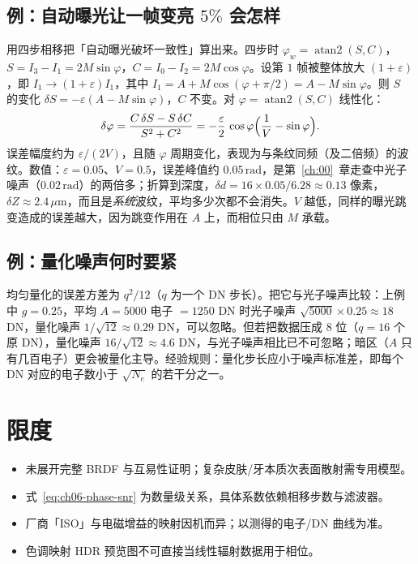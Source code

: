 \subsection{例：自动曝光让一帧变亮 $5\%$ 会怎样}

用四步相移把「自动曝光破坏一致性」算出来。四步时 $\varphi_w=\operatorname{atan2}(S,C)$，$S=I_3-I_1=2M\sin\varphi$，$C=I_0-I_2=2M\cos\varphi$。设第 $1$ 帧被整体放大 $(1+\varepsilon)$，即 $I_1\to(1+\varepsilon)I_1$，其中 $I_1=A+M\cos(\varphi+\pi/2)=A-M\sin\varphi$。则 $S$ 的变化 $\delta S=-\varepsilon(A-M\sin\varphi)$，$C$ 不变。对 $\varphi=\operatorname{atan2}(S,C)$ 线性化：
\[
  \delta\varphi=\frac{C\,\delta S-S\,\delta C}{S^2+C^2}
  =-\frac{\varepsilon}{2}\,\cos\varphi\Bigl(\frac{1}{V}-\sin\varphi\Bigr).
\]
误差幅度约为 $\varepsilon/(2V)$，且随 $\varphi$ 周期变化，表现为与条纹同频（及二倍频）的波纹。数值：$\varepsilon=0.05$、$V=0.5$，误差峰值约 $0.05\,\mathrm{rad}$，是第~\ref{ch:00}~章走查中光子噪声（$0.02\,\mathrm{rad}$）的两倍多；折算到深度，$\delta d=16\times0.05/6.28\approx0.13$ 像素，$\delta Z\approx2.4\,\mu\mathrm{m}$，而且是\emph{系统}波纹，平均多少次都不会消失。$V$ 越低，同样的曝光跳变造成的误差越大，因为跳变作用在 $A$ 上，而相位只由 $M$ 承载。

\subsection{例：量化噪声何时要紧}

均匀量化的误差方差为 $q^2/12$（$q$ 为一个 DN 步长）。把它与光子噪声比较：上例中 $g=0.25$，平均 $A=5000$ 电子 $=1250$ DN 时光子噪声 $\sqrt{5000}\times0.25\approx18$ DN，量化噪声 $1/\sqrt{12}\approx0.29$ DN，可以忽略。但若把数据压成 8 位（$q=16$ 个原 DN），量化噪声 $16/\sqrt{12}\approx4.6$ DN，与光子噪声相比已不可忽略；暗区（$A$ 只有几百电子）更会被量化主导。经验规则：量化步长应小于噪声标准差，即每个 DN 对应的电子数小于 $\sqrt{N_e}$ 的若干分之一。

\section{限度}
\label{sec:ch05-limits}

\begin{itemize}
  \item 未展开完整 BRDF 与互易性证明；复杂皮肤/牙本质次表面散射需专用模型。
  \item 式~\eqref{eq:ch06-phase-snr} 为数量级关系，具体系数依赖相移步数与滤波器。
  \item 厂商「ISO」与电磁增益的映射因机而异；以测得的电子/DN 曲线为准。
  \item 色调映射 HDR 预览图不可直接当线性辐射数据用于相位。
\end{itemize}

